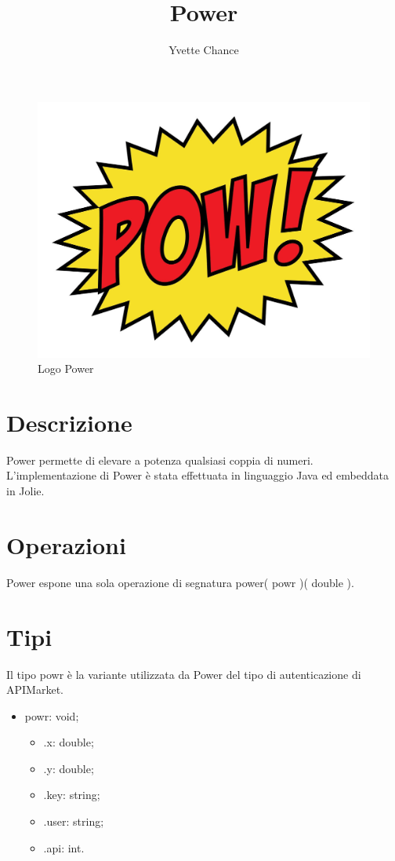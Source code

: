 \documentclass[a4paper]{article}
\title{Power}
\author{Yvette Chance}
\begin{document}
\maketitle

\begin{figure}[H]
	\centering
	\includegraphics[width=0.3\linewidth]{Power.jpg}
	\caption{Logo Power}
\end{figure}

\section{Descrizione}

Power permette di elevare a potenza qualsiasi coppia di numeri.
L'implementazione di Power è stata effettuata in linguaggio Java ed embeddata in Jolie.

\section{Operazioni}

Power espone una sola operazione di segnatura power( powr )( double ).

\section{Tipi}

Il tipo powr è la variante utilizzata da Power del tipo di autenticazione di APIMarket.
\begin{itemize}
	\item powr: void;
	\begin{itemize}
		\item .x: double;
		\item .y: double;
		\item .key: string;
		\item .user: string;
		\item .api: int.
	\end{itemize}
\end{itemize}
\end{document}
